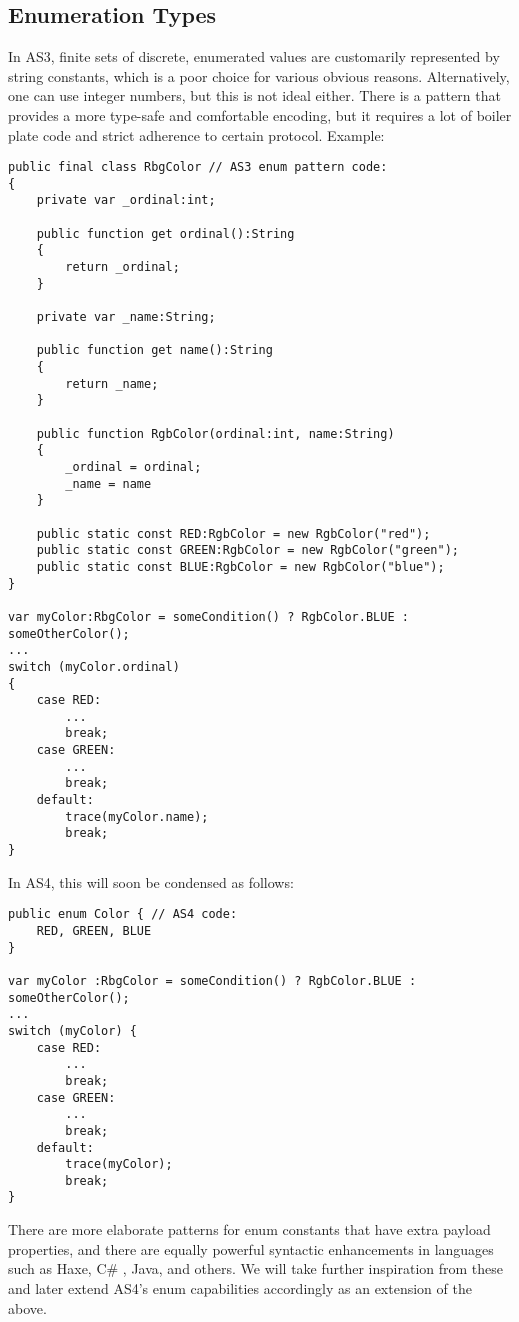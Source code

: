 \subsection{Enumeration Types}
In AS3, finite sets of discrete, enumerated values are customarily represented
by string constants, which is a poor choice for various obvious reasons.
Alternatively, one can use integer numbers, but this is not ideal either. There
is a pattern that provides a more type-safe and comfortable encoding, but it
requires a lot of boiler plate code and strict adherence to certain protocol.
Example:
\begin{verbatim}
public final class RbgColor // AS3 enum pattern code:
{
    private var _ordinal:int;

    public function get ordinal():String
    {
        return _ordinal;
    }

    private var _name:String;

    public function get name():String
    {
        return _name;
    }

    public function RgbColor(ordinal:int, name:String)
    {
        _ordinal = ordinal;
        _name = name
    }

    public static const RED:RgbColor = new RgbColor("red");
    public static const GREEN:RgbColor = new RgbColor("green");
    public static const BLUE:RgbColor = new RgbColor("blue");
}

var myColor:RbgColor = someCondition() ? RgbColor.BLUE : someOtherColor();
...
switch (myColor.ordinal)
{
    case RED:
        ...
        break;
    case GREEN:
        ...
        break;
    default:
        trace(myColor.name);
        break;
}
\end{verbatim}
In AS4, this will soon be condensed as follows:
\begin{verbatim}
public enum Color { // AS4 code:
    RED, GREEN, BLUE
}

var myColor :RbgColor = someCondition() ? RgbColor.BLUE : someOtherColor();
...
switch (myColor) {
    case RED:
        ...
        break;
    case GREEN:
        ...
        break;
    default:
        trace(myColor);
        break;
}
\end{verbatim}

There are more elaborate patterns for enum constants that have extra
payload properties, and there are equally powerful syntactic enhancements in
languages such as Haxe, C\# , Java, and others. We will take further inspiration
from these and later extend AS4's enum capabilities accordingly as an extension
of the above.

